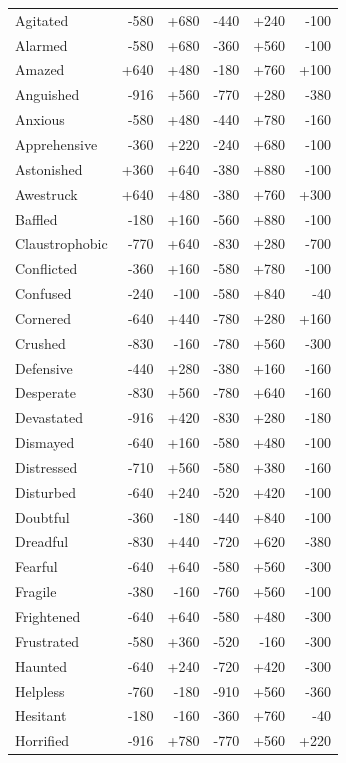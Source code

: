 \begin{longtable}{@{}p{}rrrrr@{}}
Agitated & -580 & +680 & -440 & +240 & -100 \\
Alarmed & -580 & +680 & -360 & +560 & -100 \\
Amazed & +640 & +480 & -180 & +760 & +100 \\
Anguished & -916 & +560 & -770 & +280 & -380 \\
Anxious & -580 & +480 & -440 & +780 & -160 \\
Apprehensive & -360 & +220 & -240 & +680 & -100 \\
Astonished & +360 & +640 & -380 & +880 & -100 \\
Awestruck & +640 & +480 & -380 & +760 & +300 \\
Baffled & -180 & +160 & -560 & +880 & -100 \\
Claustrophobic & -770 & +640 & -830 & +280 & -700 \\
Conflicted & -360 & +160 & -580 & +780 & -100 \\
Confused & -240 & -100 & -580 & +840 & -40 \\
Cornered & -640 & +440 & -780 & +280 & +160 \\
Crushed & -830 & -160 & -780 & +560 & -300 \\
Defensive & -440 & +280 & -380 & +160 & -160 \\
Desperate & -830 & +560 & -780 & +640 & -160 \\
Devastated & -916 & +420 & -830 & +280 & -180 \\
Dismayed & -640 & +160 & -580 & +480 & -100 \\
Distressed & -710 & +560 & -580 & +380 & -160 \\
Disturbed & -640 & +240 & -520 & +420 & -100 \\
Doubtful & -360 & -180 & -440 & +840 & -100 \\
Dreadful & -830 & +440 & -720 & +620 & -380 \\
Fearful & -640 & +640 & -580 & +560 & -300 \\
Fragile & -380 & -160 & -760 & +560 & -100 \\
Frightened & -640 & +640 & -580 & +480 & -300 \\
Frustrated & -580 & +360 & -520 & -160 & -300 \\
Haunted & -640 & +240 & -720 & +420 & -300 \\
Helpless & -760 & -180 & -910 & +560 & -360 \\
Hesitant & -180 & -160 & -360 & +760 & -40 \\
Horrified & -916 & +780 & -770 & +560 & +220 \\

\end{longtable}
